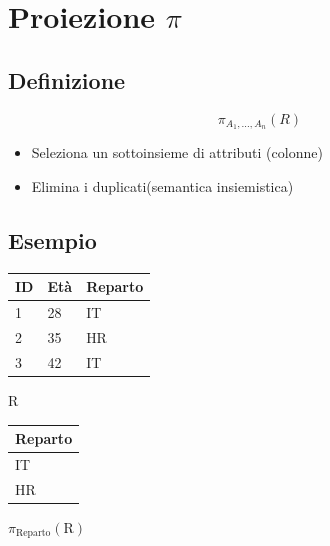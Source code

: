 \section{Proiezione $\pi$}
\subsection{Definizione}
$$
\pi_{A_1,\dots,A_n}(R)
$$
\begin{itemize}
    \item Seleziona un sottoinsieme di attributi (colonne)
    \item Elimina i duplicati(semantica insiemistica)
\end{itemize}

\subsection{Esempio}
\begin{center}

    \begin{minipage}{0.45\textwidth}
        \centering
        \begin{tabular}{|l|l|l|}
        \hline
        \textbf{ID} & \textbf{Età} & \textbf{Reparto} \\ \hline
        1 & 28 & IT \\ \hline
        2 & 35 & HR \\ \hline
        3 & 42 & IT \\ \hline
        \end{tabular}
        
        \vspace{2mm}
        R
    \end{minipage}%
    \hfill
    \begin{minipage}{0.45\textwidth}
        \centering
        \begin{tabular}{|l|}
        \hline
        \textbf{Reparto} \\ \hline
        IT \\ \hline
        HR \\ \hline
        \end{tabular}
        
        \vspace{2mm}
        $\pi_{\text{Reparto}}(\text{R})$
    \end{minipage}

\end{center}

